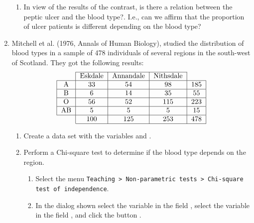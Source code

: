 \begin{enumerate}[leftmargin=*]
\begin{enumerate}
\item In view of the results of the contrast, is there a relation between the peptic ulcer and the blood type?. I.e., can we affirm that the proportion of ulcer patients is different depending on the blood type?
\end{enumerate}

\item Mitchell et al. (1976, Annals of Human Biology), studied the distribution of blood types in a sample of 478 individuals of several regions in the south-west of Scotland. They got the following results:
\[
\begin{tabular}{|l|l|l|l|l|}
\cline{2-4}
\multicolumn{1}{c|}{} & \multicolumn{1}{c|}{Eskdale} & \multicolumn{1}{c|}{Annandale} & \multicolumn{1}{c|}{Nithsdale} & \multicolumn{1}{c}{} \\
\hline
\multicolumn{1}{|c|}{A} & \multicolumn{1}{c|}{33} & \multicolumn{1}{c|}{54} & \multicolumn{1}{c|}{98} & \multicolumn{1}{c|}{185} \\
\hline
\multicolumn{1}{|c|}{B} & \multicolumn{1}{c|}{6} & \multicolumn{1}{c|}{14} & \multicolumn{1}{c|}{35} & \multicolumn{1}{c|}{55} \\
\hline
\multicolumn{1}{|c|}{O} & \multicolumn{1}{c|}{56} & \multicolumn{1}{c|}{52} & \multicolumn{1}{c|}{115} & \multicolumn{1}{c|}{223} \\
\hline
\multicolumn{1}{|c|}{AB} & \multicolumn{1}{c|}{5} & \multicolumn{1}{c|}{5} & \multicolumn{1}{c|}{5} & \multicolumn{1}{c|}{15} \\
\hline
\multicolumn{1}{c|}{} & \multicolumn{1}{c|}{100} & \multicolumn{1}{c|}{125} & \multicolumn{1}{c|}{253} & \multicolumn{1}{c|}{478} \\
\cline{2-5}
\end{tabular}
\]

\begin{enumerate}
\item Create a data set with the variables  and .

\item Perform a Chi-square test to determine if the blood type depends on the region.
\begin{indication}
\begin{enumerate}
\item Select the menu \texttt{Teaching > Non-parametric tests > Chi-square test of inde\-pendence}.
\item In the dialog shown select the variable  in the field
, select the variable  in the field , and click the button .
\end{enumerate}
\end{indication}


\end{enumerate}
\end{enumerate}
